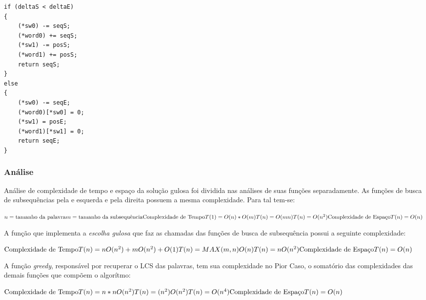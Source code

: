 \begin{lstlisting}
if (deltaS < deltaE)
{
    (*sw0) -= seqS;
    (*word0) += seqS;
    (*sw1) -= posS;
    (*word1) += posS;
    return seqS;
}
else
{
    (*sw0) -= seqE;
    (*word0)[*sw0] = 0;
    (*sw1) = posE;
    (*word1)[*sw1] = 0;
    return seqE;
}
\end{lstlisting}

\subsubsection{Análise}

Análise de complexidade de tempo e espaço da solução gulosa foi dividida
nas análises de suas funções separadamente. As funções de busca de 
subsequências pela e esquerda e pela direita possuem a mesma complexidade. 
Para tal tem-se: 

\begin{math}
n = \textnormal{tamanho da palavra} \\
m = \textnormal{tamanho da subsequência} \\ \\
\textnormal{Complexidade de Tempo} \\
T(1) = O(n) * O(m) \\
T(n) = O(mn) \\
T(n) = O(n^2) \\
\textnormal{Complexidade de Espaço} \\
T(n) = O(n)
\end{math}

A função que implementa a \emph{escolha gulosa} que faz as chamadas das 
funções de busca de subsequência possui a seguinte complexidade: 

\begin{math}
\textnormal{Complexidade de Tempo} \\
T(n) = nO(n^2) + mO(n^2) + O(1) \\
T(n) = MAX(m,n)O(n) \\
T(n) = nO(n^2) \\
\textnormal{Complexidade de Espaço}\\
T(n) = O(n)
\end{math}

A função {\it greedy}, responsável por recuperar o LCS das palavras,
tem sua complexidade no Pior Caso, o somatório das complexidades 
das demais funções que compõem o algorítmo:

\begin{math}
\textnormal{Complexidade de Tempo} \\
T(n) = n * nO(n^2) \\
T(n) = (n^2)O(n^2) \\
T(n) = O(n^4) \\
\textnormal{Complexidade de Espaço} \\
T(n) = O(n)
\end{math}





















